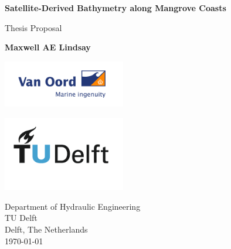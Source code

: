 \begin{titlepage}
  \begin{center}
      \vspace*{1cm}
      \color{black}
      \Huge
      \textbf{Satellite-Derived Bathymetry along Mangrove Coasts}

      \vspace{0.5cm}
       Thesis Proposal
           
      \vspace{1.5cm}
      \Large
      \textbf{Maxwell AE Lindsay}

      \large
      \vfill
           
           
      \vspace{0.8cm}
    
      \includegraphics[width=0.4\textwidth]{figures/VanOord-2048x785.png}

      \includegraphics[width=0.4\textwidth]{figures/TU_P1_full-color.png}
           
      Department of Hydraulic Engineering\\
      TU Delft\\
      Delft, The Netherlands\\
      \today
           
  \end{center}
\end{titlepage}
